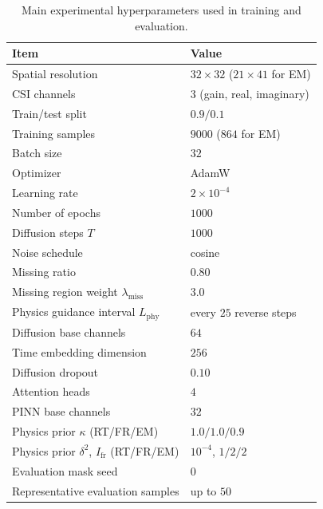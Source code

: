 \documentclass[lettersize,journal]{IEEEtran}
\begin{document}
\begin{table}[t]
\caption{Main experimental hyperparameters used in training and evaluation.}
\label{tab:exp_hparams}
\centering
\small
\begin{tabular}{p{}p{}}
\toprule
Item & Value \\ 
\midrule
Spatial resolution & $32\times 32$ ($21\times 41$ for EM) \\ 
CSI channels & $3$ (gain, real, imaginary) \\ 
Train/test split & $0.9/0.1$ \\ 
Training samples & $9000$ ($864$ for EM) \\ 
Batch size & $32$ \\ 
Optimizer & AdamW \\ 
Learning rate & $2\times 10^{-4}$ \\ 
Number of epochs & $1000$ \\ 
Diffusion steps $T$ & $1000$ \\ 
Noise schedule & cosine \\ 
Missing ratio & $0.80$ \\ 
Missing region weight $\lambda_{\mathrm{miss}}$ & $3.0$ \\ 
Physics guidance interval $L_{\mathrm{phy}}$ & every $25$ reverse steps \\ 
Diffusion base channels & $64$ \\ 
Time embedding dimension & $256$ \\ 
Diffusion dropout & $0.10$ \\ 
Attention heads & $4$ \\ 
PINN base channels & $32$ \\ 
Physics prior $\kappa$ (RT/FR/EM) & $1.0/1.0/0.9$ \\ 
Physics prior $\delta^{2}$, $I_{\mathrm{fr}}$ (RT/FR/EM) & $10^{-4}$, $1/2/2$ \\ 
Evaluation mask seed & $0$ \\ 
Representative evaluation samples & up to $50$ \\ 
\bottomrule
\end{tabular}
\end{table}
\end{document}
